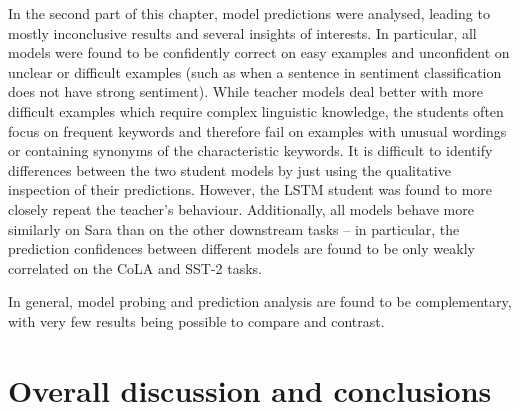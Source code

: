 \documentclass[bsc,frontabs,twoside,singlespacing,parskip,deptreport]{infthesis}
\begin{document}
{{    In the second part of this chapter, model predictions were analysed, leading to mostly inconclusive results and several insights of interests.
    In particular, all models were found to be confidently correct on easy examples and unconfident on unclear or difficult examples (such as when a sentence in sentiment classification does not have strong sentiment).
    While teacher models deal better with more difficult examples which require complex linguistic knowledge, the students often focus on frequent keywords and therefore fail on examples with unusual wordings or containing synonyms of the characteristic keywords.
    It is difficult to identify differences between the two student models by just using the qualitative inspection of their predictions.
    However, the LSTM student was found to more closely repeat the teacher's behaviour.
    Additionally, all models behave more similarly on Sara than on the other downstream tasks -- in particular, the prediction confidences between different models are found to be only weakly correlated on the CoLA and SST-2 tasks.

    In general, model probing and prediction analysis are found to be complementary, with very few results being possible to compare and contrast.
  }
}

\chapter{Overall discussion and conclusions}{
  
}
\end{document}
